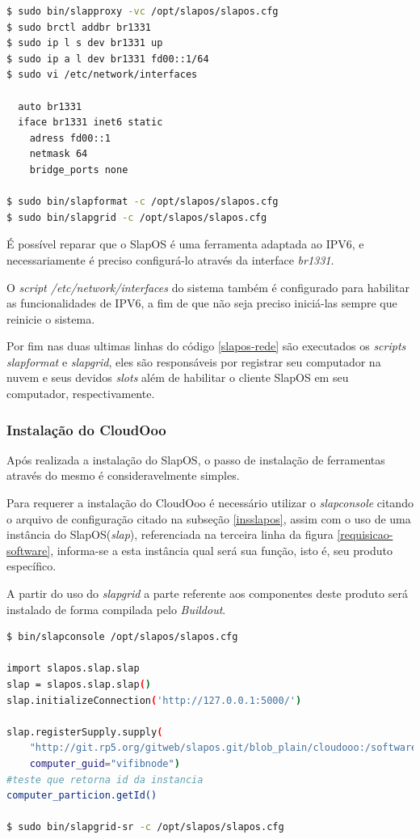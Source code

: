 {\singlespace
\begin{lstlisting}[caption=Configurações de rede do SlapOS,language=sh,label={slapos-rede}]
$ sudo bin/slapproxy -vc /opt/slapos/slapos.cfg
$ sudo brctl addbr br1331
$ sudo ip l s dev br1331 up
$ sudo ip a l dev br1331 fd00::1/64
$ sudo vi /etc/network/interfaces

  auto br1331
  iface br1331 inet6 static
    adress fd00::1
    netmask 64
    bridge_ports none

$ sudo bin/slapformat -c /opt/slapos/slapos.cfg
$ sudo bin/slapgrid -c /opt/slapos/slapos.cfg

\end{lstlisting}
}

É possível reparar que o SlapOS é uma ferramenta adaptada ao IPV6, e necessariamente é preciso configurá-lo através da interface \textit{br1331}.

O \textit{script /etc/network/interfaces} do sistema também é configurado para habilitar as funcionalidades de IPV6, a fim de que não seja preciso iniciá-las sempre que reinicie o sistema.

Por fim nas duas ultimas linhas do código \ref{slapos-rede} são executados os \textit{scripts slapformat}  e \textit{slapgrid}, eles são responsáveis por registrar seu computador na nuvem e seus devidos \textit{slots} além de habilitar o cliente SlapOS em seu computador, respectivamente.


\subsubsection{Instalação do CloudOoo}

Após realizada a instalação do SlapOS, o passo de instalação de ferramentas através do mesmo é consideravelmente simples.

Para requerer a instalação do CloudOoo é necessário utilizar o \textit{slapconsole} citando o arquivo de configuração citado na subseção \ref{insslapos}, assim com o uso de uma instância do SlapOS(\textit{slap}), referenciada na terceira linha da figura \ref{requisicao-software}, informa-se a esta instância qual será sua função, isto é, seu produto específico. 

A partir do uso do \textit{slapgrid} a parte referente aos componentes deste produto será instalado de forma compilada pelo \textit{Buildout}.


{\singlespace
\begin{lstlisting}[caption=Requisição de instalação do CloudOoo no SlapOS,language=bash,label={requisicao-software}]
$ bin/slapconsole /opt/slapos/slapos.cfg

import slapos.slap.slap
slap = slapos.slap.slap()
slap.initializeConnection('http://127.0.0.1:5000/')

slap.registerSupply.supply(
    "http://git.rp5.org/gitweb/slapos.git/blob_plain/cloudooo:/software/cloudooo/software.cfg",
    computer_guid="vifibnode")
#teste que retorna id da instancia
computer_particion.getId()

$ sudo bin/slapgrid-sr -c /opt/slapos/slapos.cfg

\end{lstlisting}
}

